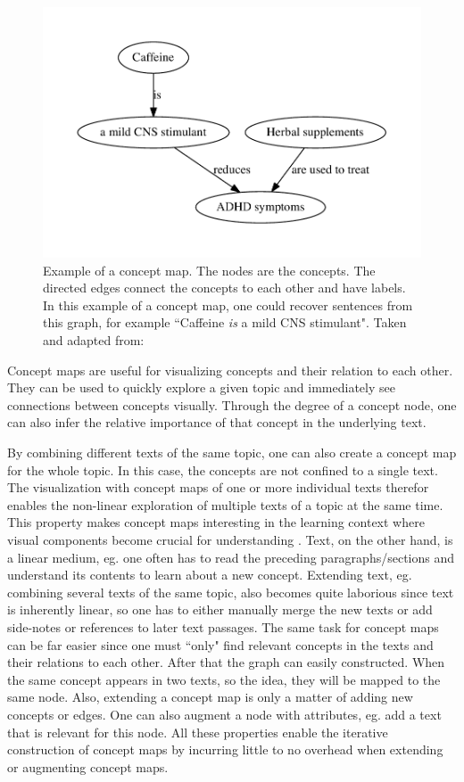 \begin{figure}[htb!]
\centering
\includegraphics[width=0.5\linewidth]{assets/figures/concept_map.pdf}
\caption[Example: Concept map]{Example of a concept map. The nodes are the concepts. The directed edges connect the concepts to each other and have labels. In this example of a concept map, one could recover sentences from this graph, for example ``Caffeine \textit{is} a mild CNS stimulant". Taken and adapted from: \cite{Falke2017}}
\label{fig:concept_map}
\end{figure}

Concept maps are useful for visualizing concepts and their relation to each other.
They can be used to quickly explore a given topic and immediately see connections between concepts visually.
Through the degree of a concept node, one can also infer the relative importance of that concept in the underlying text.

By combining different texts of the same topic, one can also create a concept map for the whole topic.
In this case, the concepts are not confined to a single text.
The visualization with concept maps of one or more individual texts therefor enables the non-linear exploration of multiple texts of a topic at the same time.
This property makes concept maps interesting in the learning context where visual components become crucial for understanding \cite{Novak1984}.
Text, on the other hand, is a linear medium, eg. one often has to read the preceding paragraphs/sections and understand its contents to learn about a new concept.
Extending text, eg. combining several texts of the same topic, also becomes quite laborious since text is inherently linear, so one has to either manually merge the new texts or add side-notes or references to later text passages.
The same task for concept maps can be far easier since one must ``only" find relevant concepts in the texts and their relations to each other. After that the graph can easily constructed.
When the same concept appears in two texts, so the idea, they will be mapped to the same node.
Also, extending a concept map is only a matter of adding new concepts or edges.
One can also augment a node with attributes, eg. add a text that is relevant for this node.
All these properties enable the iterative construction of concept maps by incurring little to no overhead when extending or augmenting concept maps.

